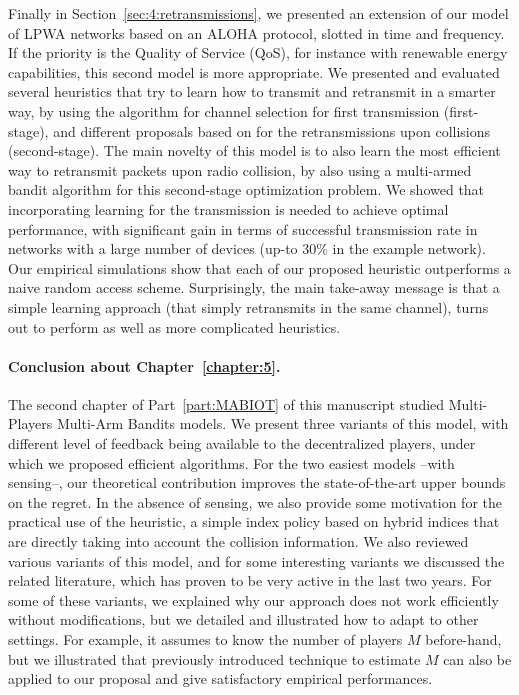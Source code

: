 Finally in Section~\ref{sec:4:retransmissions}, we presented an extension of our model of LPWA networks based on an ALOHA protocol, slotted in time and frequency.
If the priority is the Quality of Service (QoS), for instance with renewable energy capabilities, this second model is more appropriate.
We presented and evaluated several heuristics that try to learn how to transmit and retransmit in a smarter way, by using the \UCB{} algorithm for channel selection for first transmission (first-stage), and different proposals based on \UCB{} for the retransmissions upon collisions (second-stage).
The main novelty of this model is to also learn the most efficient way to retransmit packets upon radio collision, by also using a multi-armed bandit algorithm for this second-stage optimization problem.
%
We showed that incorporating learning for the transmission is needed to achieve optimal performance, with significant gain in terms of successful transmission rate in networks with a large number of devices (up-to $30\%$ in the example network).
Our empirical simulations show that each of our proposed heuristic outperforms a naive random access scheme.
Surprisingly, the main take-away message is that a simple \UCB{} learning approach (that simply retransmits in the same channel), turns out to perform as well as more complicated heuristics.


\paragraph{Conclusion about \textbf{Chapter~\ref{chapter:5}}.}

The second chapter of Part~\ref{part:MABIOT} of this manuscript studied Multi-Players Multi-Arm Bandits models.
%
We present three variants of this model,
with different level of feedback being available to the decentralized players, under which we proposed efficient algorithms.
For the two easiest models --with sensing--, our theoretical contribution improves the state-of-the-art upper bounds on the regret. In the absence of sensing, we also provide some motivation for the practical use of the \Selfish{} heuristic, a simple index policy based on hybrid indices that are directly taking  into account the collision information.
%
We also reviewed various variants of this model, and for some interesting variants we discussed the related literature, which has proven to be very active in the last two years.
For some of these variants, we explained why our approach does not work efficiently without modifications, but we detailed and illustrated how to adapt \MCTopM{} to other settings.
For example, it assumes to know the number of players $M$ before-hand, but we illustrated that previously introduced technique to estimate $M$ can also be applied to our proposal and give satisfactory empirical performances.


